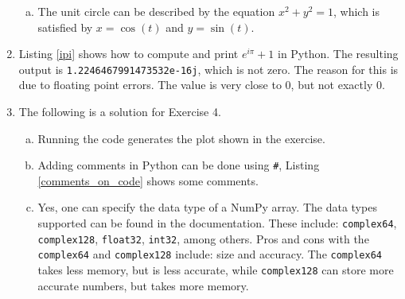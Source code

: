 \begin{enumerate}
\begin{enumerate}[a)]
\item The unit circle can be described by the equation $x^{2} + y^{2} = 1$, which is satisfied by $x=\cos(t)$ and $y =\sin(t)$. 
\end{enumerate}


\item Listing \ref{ipi} shows how to compute and print $e^{i\pi}+1$ in Python. The resulting output is \verb|1.2246467991473532e-16j|, which is not zero.
The reason for this is due to floating point errors. The value is very close to 0, but not exactly 0. 



\item The following is a solution for Exercise 4.

\begin{enumerate}[a)]
\item Running the code generates the plot shown in the exercise. 

\item Adding comments in Python can be done using \verb|#|, Listing \ref{comments_on_code} shows some comments.


\item Yes, one can specify the data type of a NumPy array. The data types supported can be found in the documentation. 
These include: \verb|complex64|, \verb|complex128|, \verb|float32|, \verb|int32|, among others. 
Pros and cons with the \verb|complex64| and \verb|complex128| include: size and accuracy. The \verb|complex64|
takes less memory, but is less accurate, while \verb|complex128| can store more accurate numbers, but takes more memory.

\end{enumerate}





\end{enumerate}
